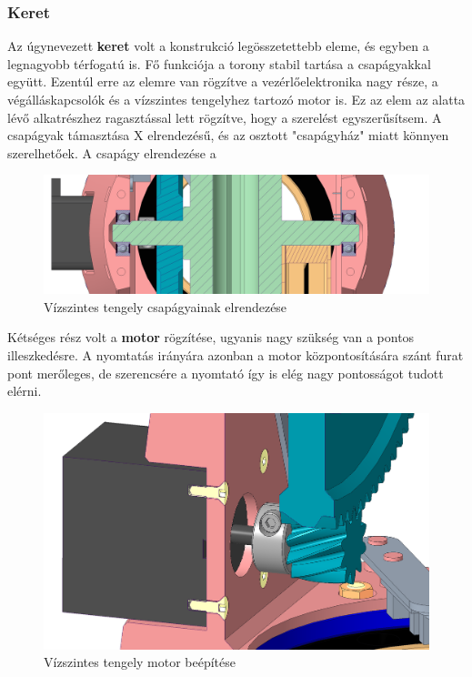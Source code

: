 \documentclass[12pt,a4paper]{article}
\begin{document}
\subsubsection{Keret}
Az úgynevezett \textbf{keret} volt a konstrukció legösszetettebb eleme, és egyben a legnagyobb térfogatú is. Fő funkciója a torony stabil tartása a csapágyakkal együtt. Ezentúl erre az elemre van rögzítve a vezérlőelektronika nagy része, a végálláskapcsolók és a vízszintes tengelyhez tartozó motor is. Ez az elem az alatta lévő alkatrészhez ragasztással lett rögzítve, hogy a szerelést egyszerűsítsem. A csapágyak támasztása X elrendezésű, és az osztott "csapágyház" miatt könnyen szerelhetőek. A csapágy elrendezése  a

\begin{figure}[h!]
	\centering
	\includegraphics[width=1\linewidth]{mech_felsotengely}
	\caption{Vízszintes tengely csapágyainak elrendezése}
	\label{fig:mech_felsotengely}
\end{figure}


Kétséges rész volt a \textbf{motor} rögzítése, ugyanis nagy szükség van a pontos illeszkedésre. A nyomtatás irányára azonban a motor központosítására szánt furat pont merőleges, de szerencsére a nyomtató így is elég nagy pontosságot tudott elérni.

\begin{figure}[h!]
	\centering
	\includegraphics[width=1 \linewidth]{mech_motorbeepites}
	\caption{Vízszintes tengely motor beépítése}
	\label{fig:mech_motorbeepites}
\end{figure}
\end{document}
